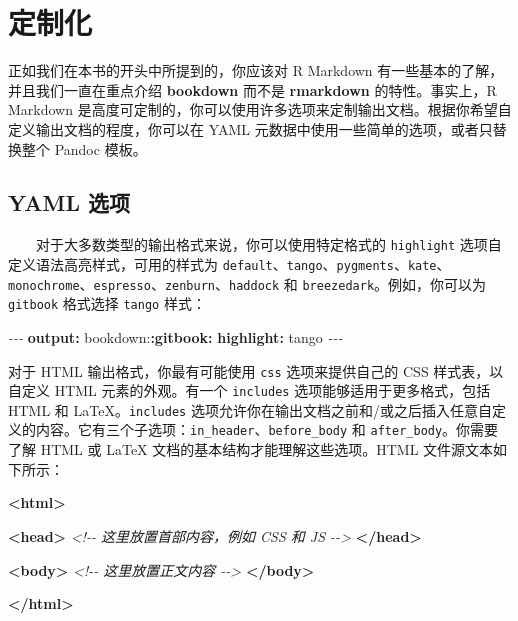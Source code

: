 \documentclass[
  12pt,
]{krantz}
\newenvironment{Shaded}{\begin{snugshade}}{\end{snugshade}}
\newcommand{\AttributeTok}[1]{\textcolor[rgb]{0.13,0.29,0.53}{#1}}
\newcommand{\CommentTok}[1]{\textcolor[rgb]{0.56,0.35,0.01}{\textit{#1}}}
\newcommand{\FunctionTok}[1]{\textcolor[rgb]{0.13,0.29,0.53}{\textbf{#1}}}
\newcommand{\KeywordTok}[1]{\textcolor[rgb]{0.13,0.29,0.53}{\textbf{#1}}}
\newcommand{\PreprocessorTok}[1]{\textcolor[rgb]{0.56,0.35,0.01}{\textit{#1}}}
\theoremstyle{definition}
\theoremstyle{definition}
\theoremstyle{definition}
\theoremstyle{definition}
\theoremstyle{remark}
\begin{document}
\hypertarget{customization}{%
\chapter{定制化}\label{customization}}

正如我们在本书的开头中所提到的，你应该对 R Markdown 有一些基本的了解，并且我们一直在重点介绍 \textbf{bookdown} 而不是 \textbf{rmarkdown} 的特性。事实上，R Markdown 是高度可定制的，你可以使用许多选项来定制输出文档。根据你希望自定义输出文档的程度，你可以在 YAML 元数据中使用一些简单的选项，或者只替换整个 Pandoc 模板。

\hypertarget{yaml-options}{%
\section{YAML 选项}\label{yaml-options}}

  对于大多数类型的输出格式来说，你可以使用特定格式的 \texttt{highlight} 选项自定义语法高亮样式，可用的样式为 \texttt{default}、\texttt{tango}、\texttt{pygments}、\texttt{kate}、\texttt{monochrome}、\texttt{espresso}、\texttt{zenburn}、\texttt{haddock} 和 \texttt{breezedark}。例如，你可以为 \texttt{gitbook} 格式选择 \texttt{tango} 样式：

\begin{Shaded}
\begin{Highlighting}[]
\PreprocessorTok{{-}{-}{-}}
\FunctionTok{output}\KeywordTok{:}
\AttributeTok{  bookdown:}\FunctionTok{:gitbook}\KeywordTok{:}
\AttributeTok{    }\FunctionTok{highlight}\KeywordTok{:}\AttributeTok{ tango}
\PreprocessorTok{{-}{-}{-}}
\end{Highlighting}
\end{Shaded}

对于 HTML 输出格式，你最有可能使用 \texttt{css} 选项来提供自己的 CSS 样式表，以自定义 HTML 元素的外观。有一个 \texttt{includes} 选项能够适用于更多格式，包括 HTML 和 LaTeX。\texttt{includes} 选项允许你在输出文档之前和/或之后插入任意自定义的内容。它有三个子选项：\texttt{in\_header}、\texttt{before\_body} 和 \texttt{after\_body}。你需要了解 HTML 或 LaTeX 文档的基本结构才能理解这些选项。HTML 文件源文本如下所示：

\begin{Shaded}
\begin{Highlighting}[]
\KeywordTok{\textless{}html\textgreater{}}
  
  \KeywordTok{\textless{}head\textgreater{}}
  \CommentTok{\textless{}!{-}{-} 这里放置首部内容，例如 CSS 和 JS {-}{-}\textgreater{}}
  \KeywordTok{\textless{}/head\textgreater{}}
  
  \KeywordTok{\textless{}body\textgreater{}}
  \CommentTok{\textless{}!{-}{-} 这里放置正文内容 {-}{-}\textgreater{}}
  \KeywordTok{\textless{}/body\textgreater{}}

\KeywordTok{\textless{}/html\textgreater{}}
\end{Highlighting}
\end{Shaded}
\end{document}
